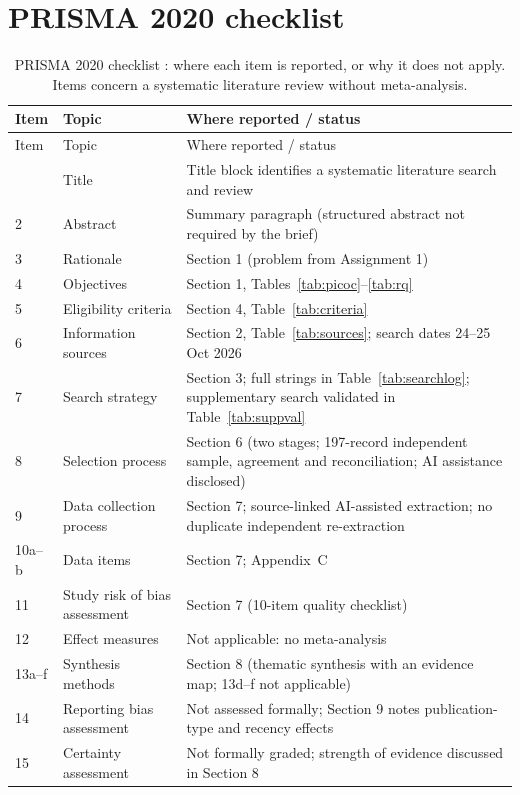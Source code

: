 \section{PRISMA 2020 checklist}
{\footnotesize
\begin{longtable}{@{}P{0.9cm}P{5.6cm}P{9.4cm}@{}}
\caption{PRISMA 2020 checklist \cite{page2021}: where each item is reported, or why it does not apply. Items concern a systematic literature review without meta-analysis.}\label{tab:prismacheck}\\
\toprule Item & Topic & Where reported / status \\ \midrule \endfirsthead
\toprule Item & Topic & Where reported / status \\ \midrule \endhead
\bottomrule {} & Title & Title block identifies a systematic literature search and review \\
2 & Abstract & Summary paragraph (structured abstract not required by the brief) \\
3 & Rationale & Section 1 (problem from Assignment 1) \\
4 & Objectives & Section 1, Tables~\ref{tab:picoc}--\ref{tab:rq} \\
5 & Eligibility criteria & Section 4, Table~\ref{tab:criteria} \\
6 & Information sources & Section 2, Table~\ref{tab:sources}; search dates 24--25 Oct 2026 \\
7 & Search strategy & Section 3; full strings in Table~\ref{tab:searchlog}; supplementary search validated in Table~\ref{tab:suppval} \\
8 & Selection process & Section 6 (two stages; 197-record independent sample, agreement and reconciliation; AI assistance disclosed) \\
9 & Data collection process & Section 7; source-linked AI-assisted extraction; no duplicate independent re-extraction \\
10a--b & Data items & Section 7; Appendix~C \\
11 & Study risk of bias assessment & Section 7 (10-item quality checklist) \\
12 & Effect measures & Not applicable: no meta-analysis \\
13a--f & Synthesis methods & Section 8 (thematic synthesis with an evidence map; 13d--f not applicable) \\
14 & Reporting bias assessment & Not assessed formally; Section 9 notes publication-type and recency effects \\
15 & Certainty assessment & Not formally graded; strength of evidence discussed in Section 8 \\

\end{longtable}}
